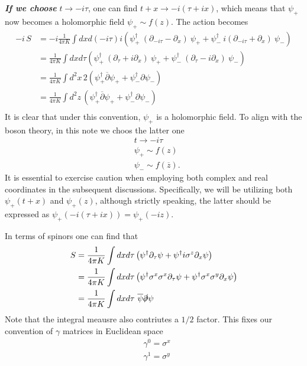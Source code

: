 \documentclass[submission, PhysLectNotes]{SciPost}
\begin{document}
\textbf{\textit{If we choose}} $t \rightarrow -i\tau$, one can find $t+x \rightarrow -i\left(\tau + ix\right)$, which means that $\psi_{+}$ now becomes a holomorphic field $\psi_{+} \sim f(z)$. The action becomes
\begin{equation}
	\begin{aligned}
		-i\,S &= -i\frac{1}{4\pi K}\int dx d(-i\tau) i\left(\psi_{+}^\dagger \ (\partial_{-i\tau} - \partial_x)\ \psi_{+} + \psi_{-}^\dagger \ i(\partial_{-i\tau} + \partial_x)\ \psi_{-} \right) \\
		&= \frac{1}{4\pi K}\int dx d\tau \left(\psi_{+}^\dagger \ (\partial_\tau + i\partial_x)\ \psi_{+} + \psi_{-}^\dagger \ (\partial_\tau - i \partial_x)\ \psi_{-} \right) \\
		&= \frac{1}{4\pi K}\int d^2x \,2\left(\psi_{+}^\dagger \overline{\partial} \psi_{+} + \psi_{-}^\dagger {\partial} \psi_{-} \right) \\
		&= \frac{1}{4\pi K}\int d^2z\, \left(\psi_{+}^\dagger \overline{\partial} \psi_{+} + \psi_{-}^\dagger {\partial} \psi_{-} \right) \\
	\end{aligned}
\end{equation}
It is clear that under this convention, $\psi_{+}$ is a holomorphic field. To align with the boson theory, in this note we choos the latter one
\begin{equation}
	\begin{aligned}
		&t \rightarrow -i\tau \\
		&\psi_{+} \sim f(z) \\
		&\psi_{-} \sim f(\overline{z}).
	\end{aligned}
\end{equation}
It is essential to exercise caution when employing both complex and real coordinates in the subsequent discussions. Specifically, we will be utilizing both $\psi_{+}(t+x)$ and $\psi_{+}(z)$, although strictly speaking, the latter should be expressed as $\psi_{+}(-i(\tau+ix)) = \psi_{+}(-iz)$.

In terms of spinors one can find that
\begin{equation}
	\begin{aligned}
		S &= \frac{1}{4\pi K} \int dx d\tau \left( \psi^\dagger \partial_\tau \psi + \psi^\dagger i\sigma^z \partial_x \psi \right)\\
		&=  \frac{1}{4\pi K} \int dxd\tau \left( \psi^\dagger \sigma^x\sigma^x\partial_\tau \psi + \psi^\dagger \sigma^x \sigma^y \partial_x \psi \right)\\
		&=  \frac{1}{4\pi K} \int dxd\tau \ \overline{\psi} \slashed{\partial} \psi
	\end{aligned}
\end{equation}
Note that the integral meausre also contriutes a $1/2$ factor. This fixes our convention of $\gamma$ matrices in Euclidean space
\begin{equation}
	\begin{aligned}
		&\gamma^0 = \sigma^x \\
		&\gamma^1 = \sigma^y
	\end{aligned}
\end{equation}
		
\end{document}
